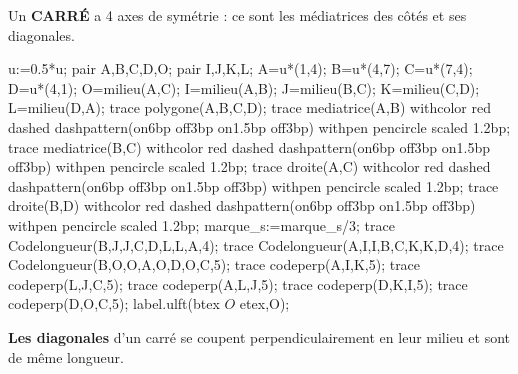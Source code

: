 \begin{changemargin}{-5mm}{-15mm}
    \begin{propriete}[\admise]
        \begin{minipage}{0.65\linewidth}
            Un \textbf{CARRÉ} a 4 axes de symétrie : ce sont les médiatrices des côtés et ses diagonales.
        \end{minipage}
        \hfill
        \begin{minipage}{0.25\linewidth}
            \begin{center}
                \begin{Geometrie}[CoinHD={(4u,4u)}]
                    u:=0.5*u;
                    pair A,B,C,D,O;
                    pair I,J,K,L;
                    A=u*(1,4);
                    B=u*(4,7);
                    C=u*(7,4);
                    D=u*(4,1);
                    O=milieu(A,C);
                    I=milieu(A,B);
                    J=milieu(B,C);
                    K=milieu(C,D);
                    L=milieu(D,A);
                    trace polygone(A,B,C,D);
                    trace mediatrice(A,B) withcolor red dashed dashpattern(on6bp off3bp on1.5bp off3bp) withpen pencircle scaled 1.2bp;
                    trace mediatrice(B,C) withcolor red dashed dashpattern(on6bp off3bp on1.5bp off3bp) withpen pencircle scaled 1.2bp;
                    trace droite(A,C) withcolor red dashed dashpattern(on6bp off3bp on1.5bp off3bp) withpen pencircle scaled 1.2bp;
                    trace droite(B,D) withcolor red dashed dashpattern(on6bp off3bp on1.5bp off3bp) withpen pencircle scaled 1.2bp;
                    marque_s:=marque_s/3;
                    trace Codelongueur(B,J,J,C,D,L,L,A,4);
                    trace Codelongueur(A,I,I,B,C,K,K,D,4);
                    trace Codelongueur(B,O,O,A,O,D,O,C,5);
                    trace codeperp(A,I,K,5);
                    trace codeperp(L,J,C,5);
                    trace codeperp(A,L,J,5);
                    trace codeperp(D,K,I,5);
                    trace codeperp(D,O,C,5);
                    label.ulft(btex $O$ etex,O);
                \end{Geometrie}
            \end{center}
        \end{minipage} 
    \end{propriete}
    \begin{remarque}

        \textbf{Les diagonales} d'un carré se coupent perpendiculairement en leur milieu et sont de même longueur.
    \end{remarque}
    

\end{changemargin}
